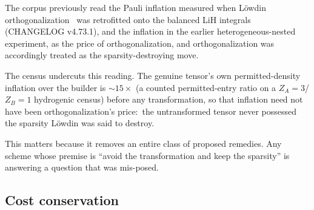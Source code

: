 \documentclass[aps,pra,twocolumn,superscriptaddress,longbibliography]{revtex4-2}
\begin{document}
The corpus previously read the Pauli inflation measured when L\"owdin
orthogonalization~\cite{lowdin1950} was retrofitted onto the balanced LiH
integrals (CHANGELOG v4.73.1), and the inflation in the earlier
heterogeneous-nested experiment, as the price of orthogonalization, and
orthogonalization was accordingly treated as the sparsity-destroying move.

The census undercuts this reading.  The
genuine tensor's own permitted-density inflation over the builder is
$\sim 15\times$ (a counted permitted-entry ratio on a $Z_A = 3$/$Z_B = 1$
hydrogenic census) before any transformation, so that inflation need not
have been orthogonalization's price:\ the untransformed tensor never
possessed the sparsity L\"owdin was said to destroy.

This matters because it removes an entire class of proposed remedies.
Any scheme whose premise is ``avoid the transformation and keep the
sparsity'' is answering a question that was mis-posed.

\subsection{Cost conservation}
\end{document}
